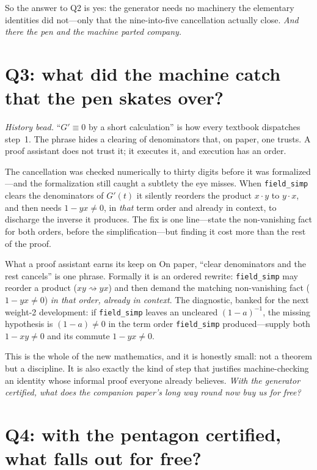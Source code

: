 \documentclass[11pt]{article}
\newcommand{\lean}[1]{\texttt{#1}}
\begin{document}
So the answer to Q2 is yes: the generator needs no machinery the elementary identities did
not---only that the nine-into-five cancellation actually close. \emph{And there the pen and
the machine parted company.}

\section{Q3: what did the machine catch that the pen skates over?}\label{sec:caught}

\emph{History bead.} ``$G'\equiv0$ by a short calculation'' is how every textbook dispatches
step~1. The phrase hides a clearing of denominators that, on paper, one trusts. A proof
assistant does not trust it; it executes it, and execution has an order.

The cancellation was checked numerically to thirty digits before it was formalized---and the
formalization still caught a subtlety the eye misses. When \lean{field\_simp} clears the
denominators of $G'(t)$ it silently reorders the product $x\cdot y$ to $y\cdot x$, and then
needs $1-yx\neq0$, in \emph{that} term order and already in context, to discharge the inverse
it produces. The fix is one line---state the non-vanishing fact for both orders, before the
simplification---but finding it cost more than the rest of the proof.

\begin{recipebox}{What a proof assistant earns its keep on}
On paper, ``clear denominators and the rest cancels'' is one phrase. Formally it is an
ordered rewrite: \lean{field\_simp} may reorder a product ($x y \rightsquigarrow y x$) and
then demand the matching non-vanishing fact ($1-yx\neq0$) \emph{in that order, already in
context}. The diagnostic, banked for the next weight-2 development: if \lean{field\_simp}
leaves an uncleared $(1-a)^{-1}$, the missing hypothesis is $(1-a)\neq0$ in the term order
\lean{field\_simp} produced---supply both $1-xy\neq0$ and its commute $1-yx\neq0$.
\end{recipebox}

This is the whole of the new mathematics, and it is honestly small: not a theorem but a
discipline. It is also exactly the kind of step that justifies machine-checking an identity
whose informal proof everyone already believes. \emph{With the generator certified, what
does the companion paper's long way round now buy us for free?}

\section{Q4: with the pentagon certified, what falls out for free?}\label{sec:corollaries}
\end{document}
